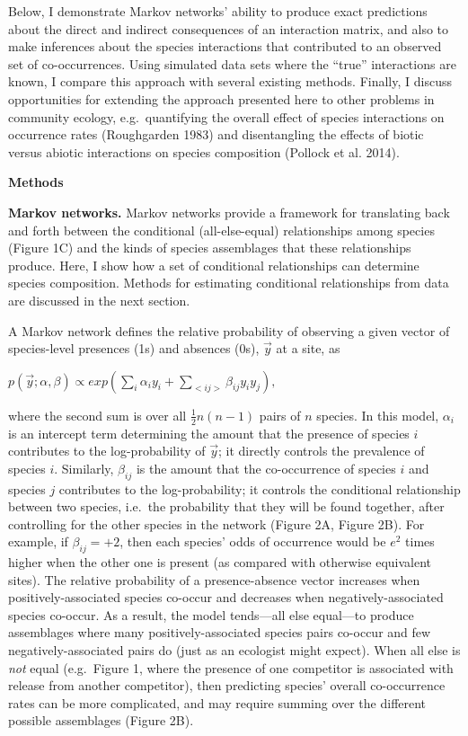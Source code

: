 \documentclass[12pt,]{article}
\begin{document}
\begin{spacing}{1.9}
\begin{flushleft}
Below, I demonstrate Markov networks' ability to produce exact
predictions about the direct and indirect consequences of an interaction
matrix, and also to make inferences about the species interactions that
contributed to an observed set of co-occurrences. Using simulated data
sets where the ``true'' interactions are known, I compare this approach
with several existing methods. Finally, I discuss opportunities for
extending the approach presented here to other problems in community
ecology, e.g.~quantifying the overall effect of species interactions on
occurrence rates (Roughgarden 1983) and disentangling the effects of
biotic versus abiotic interactions on species composition (Pollock et
al. 2014).

\noindent\textbf{Methods}

\noindent
\textbf{Markov networks.} Markov networks provide a framework for
translating back and forth between the conditional (all-else-equal)
relationships among species (Figure 1C) and the kinds of species
assemblages that these relationships produce. Here, I show how a set of
conditional relationships can determine species composition. Methods for
estimating conditional relationships from data are discussed in the next
section.

A Markov network defines the relative probability of observing a given
vector of species-level presences (1s) and absences (0s), \(\vec{y}\) at
a site, as

\centering

\(\displaystyle{p(\vec{y}; \alpha, \beta) \propto exp(\sum_{i}\alpha_i y_i + \sum_{<ij>}\beta_{ij}y_i y_j),}\)

\raggedright
\setlength{\parindent}{2em}

\noindent where the second sum is over all \(\frac{1}{2}n(n-1)\) pairs
of \(n\) species. In this model, \(\alpha_{i}\) is an intercept term
determining the amount that the presence of species \(i\) contributes to
the log-probability of \(\vec{y}\); it directly controls the prevalence
of species \(i\). Similarly, \(\beta_{ij}\) is the amount that the
co-occurrence of species \(i\) and species \(j\) contributes to the
log-probability; it controls the conditional relationship between two
species, i.e.~the probability that they will be found together, after
controlling for the other species in the network (Figure 2A, Figure 2B).
For example, if \(\beta_{ij} = +2\), then each species' odds of
occurrence would be \(e^2\) times higher when the other one is present
(as compared with otherwise equivalent sites). The relative probability
of a presence-absence vector increases when positively-associated
species co-occur and decreases when negatively-associated species
co-occur. As a result, the model tends---all else equal---to produce
assemblages where many positively-associated species pairs co-occur and
few negatively-associated pairs do (just as an ecologist might expect).
When all else is \emph{not} equal (e.g.~Figure 1, where the presence of
one competitor is associated with release from another competitor), then
predicting species' overall co-occurrence rates can be more complicated,
and may require summing over the different possible assemblages (Figure
2B).


\end{flushleft}
\end{spacing}
\end{document}
